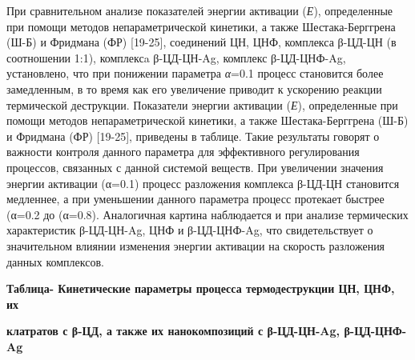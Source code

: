 При сравнительном анализе показателей энергии активации (\emph{Е}),
определенные при помощи методов непараметрической кинетики, а также
Шестака-Берггрена (Ш-Б) и Фридмана (ФР) {[}19-25{]}, соединений ЦН, ЦНФ,
комплекса β-ЦД-ЦН (в соотношении 1:1), комплексa β-ЦД-ЦН-Ag, комплекс
β-ЦД-ЦНФ-Ag, установлено, что при понижении параметра \emph{α}=0.1
процесс становится более замедленным, в то время как его увеличение
приводит к ускорению реакции термической деструкции. Показатели энергии
активации (\emph{Е}), определенные при помощи методов непараметрической
кинетики, а также Шестака-Берггрена (Ш-Б) и Фридмана (ФР) {[}19-25{]},
приведены в таблице. Такие результаты говорят о важности контроля
данного параметра для эффективного регулирования процессов, связанных с
данной системой веществ. При увеличении значения энергии активации
(α=0.1) процесс разложения комплекса β-ЦД-ЦН становится медленнее, а при
уменьшении данного параметра процесс протекает быстрее (α=0.2 до
(α=0.8). Аналогичная картина наблюдается и при анализе термических
характеристик β-ЦД-ЦН-Ag, ЦНФ и β-ЦД-ЦНФ-Ag, что свидетельствует о
значительном влиянии изменения энергии активации на скорость разложения
данных комплексов.

{\bfseries Таблица- Кинетические параметры процесса термодеструкции ЦН,
ЦНФ, их}

{\bfseries клатратов с β-ЦД, а также их нанокомпозиций с β-ЦД-ЦН-Ag,
β-ЦД-ЦНФ-Ag}


